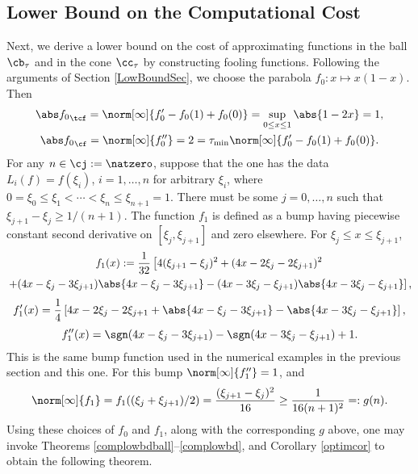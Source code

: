 \subsection{Lower Bound on the Computational Cost}
Next, we derive a lower bound on the cost of approximating functions in the ball $\cb_{\tau}$ and in the cone $\cc_{\tau}$ by constructing fooling functions. Following the arguments of Section \ref{LowBoundSec}, we choose the parabola $f_0: x \mapsto x(1-x)$. Then
\begin{gather*}
\Ftnorm{f_0}=\norm[\infty]{f'_0-f_0(1)+f_0(0)}=\sup_{0 \le x \le 1} \abs{1-2x} = 1, \\ \Fnorm{f_0}=\norm[\infty]{f''_0}=2= \tau_{\min} \norm[\infty]{f'_0-f_0(1)+f_0(0)}.
\end{gather*}
For any $n \in \cj:=\natzero$, suppose that the one has the data $L_i(f)=f(\xi_i)$, $i=1, \ldots, n$ for arbitrary $\xi_i$, where $0=\xi_0 \le \xi_1 < \cdots < \xi_n \le \xi_{n+1} = 1$.  There must be some $j=0, \ldots, n$ such that $\xi_{j+1} - \xi_j \ge 1/(n+1)$.  The function $f_{1}$ is defined as a bump having piecewise constant second derivative on $[\xi_j, \xi_{j+1}]$ and zero elsewhere.  For $\xi_{j} \le x \leq \xi_{j+1}$,
\begin{multline*}
f_{1}(x):=
\frac{1}{32} \left [4(\xi_{j+1}-\xi_j)^2 + (4x-2\xi_j-2\xi_{j+1})^2  \right. \\
\left. + (4x-\xi_j-3\xi_{j+1})\abs{4x-\xi_j-3\xi_{j+1}} -(4x-3\xi_j-\xi_{j+1})\abs{4x-3\xi_j-\xi_{j+1}} \right],
\end{multline*}
\[
f'_{1}(x)=
\frac{1}{4} \left [4x-2\xi_j-2\xi_{j+1} + \abs{4x-\xi_j-3\xi_{j+1}} -\abs{4x-3\xi_j-\xi_{j+1}} \right],
\]
\[
f''_{1}(x)=\sgn(4x-\xi_j-3\xi_{j+1}) - \sgn(4x-3\xi_j-\xi_{j+1}) + 1.
\]
This is the same bump function used in the numerical examples in the previous section and this one.  For this bump $\norm[\infty]{f''_1}=1$, and
\[
\norm[\infty]{f_1}=f_1((\xi_j+\xi_{j+1})/2)= \frac{(\xi_{j+1} - \xi_j)^2}{16} \ge \frac{1}{16(n+1)^2} =: g(n).
\]
Using these choices of $f_0$ and $f_1$, along with the corresponding $g$ above, one may invoke Theorems \ref{complowbdball}--\ref{complowbd}, and Corollary \ref{optimcor} to obtain the following theorem.

